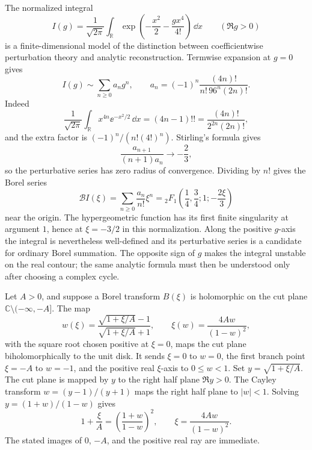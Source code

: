 \begin{example}
\label{ex:zero-dimensional-quartic-large-order}
The normalized integral
\begin{equation}
  I(g)
  =
  \frac1{\sqrt{2\pi}}
  \int_{\mathbb R}
  \exp\left(-\frac{x^2}{2}-\frac{g x^4}{4!}\right)\,\dd x
  \qquad(\Re g>0)
  \label{eq:zero-dimensional-quartic-integral}
\end{equation}
is a finite-dimensional model of the distinction between coefficientwise
perturbation theory and analytic reconstruction.  Termwise expansion at
\(g=0\) gives
\begin{equation}
  I(g)\sim\sum_{n\ge0}a_n g^n,
  \qquad
  a_n
  =
  (-1)^n\frac{(4n)!}{n!\,96^n(2n)!}.
  \label{eq:zero-dimensional-quartic-coefficients}
\end{equation}
Indeed
\[
  \frac1{\sqrt{2\pi}}\int_{\mathbb R}x^{4n}\ee^{-x^2/2}\,\dd x
  =
  (4n-1)!!
  =
  \frac{(4n)!}{2^{2n}(2n)!},
\]
and the extra factor is \((-1)^n/(n!(4!)^n)\).  Stirling's formula gives
\begin{equation}
  \frac{a_{n+1}}{(n+1)a_n}\longrightarrow -\frac23 ,
  \label{eq:zero-dimensional-quartic-ratio}
\end{equation}
so the perturbative series has zero radius of convergence.  Dividing by
\(n!\) gives the Borel series
\begin{equation}
  \mathcal B I(\xi)
  =
  \sum_{n\ge0}\frac{a_n}{n!}\xi^n
  =
  {}_2F_1\left(\frac14,\frac34;1;-\frac{2\xi}{3}\right)
  \label{eq:zero-dimensional-quartic-borel-hypergeometric}
\end{equation}
near the origin.  The hypergeometric function has its first finite singularity
at argument \(1\), hence at \(\xi=-3/2\) in this normalization.  Along the
positive \(g\)-axis the integral is nevertheless well-defined and its
perturbative series is a candidate for ordinary Borel summation.  The
opposite sign of \(g\) makes the integral unstable on the real contour; the
same analytic formula must then be understood only after choosing a complex
cycle.
\end{example}

Let \(A>0\), and suppose a Borel transform \(B(\xi)\) is holomorphic on the
cut plane \(\mathbb C\setminus(-\infty,-A]\).  The map
\begin{equation}
  w(\xi)
  =
  \frac{\sqrt{1+\xi/A}-1}{\sqrt{1+\xi/A}+1},
  \qquad
  \xi(w)=\frac{4Aw}{(1-w)^2},
  \label{eq:conformal-borel-negative-cut-map}
\end{equation}
with the square root chosen positive at \(\xi=0\), maps the cut plane
biholomorphically to the unit disk.  It sends \(\xi=0\) to \(w=0\), the first
branch point \(\xi=-A\) to \(w=-1\), and the positive real \(\xi\)-axis to
\(0\le w<1\).
Set \(y=\sqrt{1+\xi/A}\).  The cut plane is mapped by \(y\) to the right half
plane \(\Re y>0\).  The Cayley transform \(w=(y-1)/(y+1)\) maps the right
half plane to \(|w|<1\).  Solving \(y=(1+w)/(1-w)\) gives
\[
  1+\frac{\xi}{A}=\left(\frac{1+w}{1-w}\right)^2,
  \qquad
  \xi=\frac{4Aw}{(1-w)^2}.
\]
The stated images of \(0\), \(-A\), and the positive real ray are immediate.

